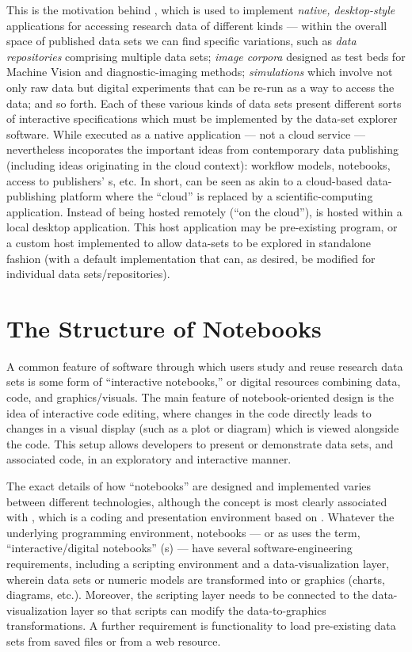 \documentclass[11pt,letterpaper]{article}
\newcommand{\ATextCClr}[1]{\textcolor{atcColor}{\textbf{#1}}}
\newcommand{\MdsX}{\resizebox{!}{7.5pt}{\ATextCClr{MdsX}}}
\newcommand{\lsMdsX}{\resizebox{!}{9pt}{\ATextCClr{MdsX}}}
\newcommand{\API}{\resizebox{!}{7pt}{\AcronymText{API}}}
\newcommand{\ThreeD}{\resizebox{!}{7pt}{\AcronymText{3D}}}
\newcommand{\TwoD}{\resizebox{!}{7pt}{\AcronymText{2D}}}
\newcommand{\textscc}[1]{{\color{orr!35!black}{{%
						\fontfamily{Cabin-TLF}\fontseries{b}\selectfont{\textsc{\scriptsize{#1}}}}}}}
\newcommand{\AcronymText}[1]{{\textscc{#1}}}
\newcommand{\p}[1]{

\vspace{1em}#1}
\newcommand{\q}[1]{{\fontfamily{qcr}\selectfont ``}#1{\fontfamily{qcr}\selectfont ''}}
\begin{document}
{\p{This is the motivation behind \Mdsx{}, which 
is used to implement \textit{native,} 
\textit{desktop-style} applications 
for accessing research data of different 
kinds --- within the overall space of 
published data sets we can find specific 
variations, such as \textit{data repositories} 
comprising multiple data sets; \textit{image corpora} 
designed as test beds for Machine Vision and 
diagnostic-imaging methods; \textit{simulations} 
which involve not only raw data but digital 
experiments that can be re-run as a way 
to access the data; and so forth.  Each of 
these various kinds of data sets present 
different sorts of interactive specifications 
which must be implemented by the data-set explorer 
software.  While executed as a native application 
--- not a cloud service --- \MdsX{} nevertheless incoporates 
the important ideas from contemporary data publishing 
(including ideas originating in the cloud context): 
workflow models, notebooks, access to publishers' 
\API{}s, etc.  In short, \MdsX{} can be seen as akin to 
a cloud-based data-publishing platform 
where the \q{cloud} is replaced by a 
scientific-computing application.  Instead of 
being hosted remotely (\q{on the cloud}), 
\MdsX{} is hosted within a local desktop application.  
This host application may be pre-existing 
program, or a custom host implemented 
to allow \MdsX{} data-sets to be explored in standalone 
fashion (with a default implementation that 
can, as desired, be modified for individual 
data sets/repositories).}


\section[The Structure of MdsX Notebooks]{The Structure of \protect\lsMdsX{} Notebooks}

\p{A common feature of software through which users 
study and reuse research data sets is some 
form of \q{interactive notebooks,} or 
digital resources combining data, code, 
and graphics/visuals.  The main feature of 
notebook-oriented design is the idea of 
interactive code editing, where changes in 
the code directly leads to changes in a visual 
display (such as a plot or diagram) which is 
viewed alongside the code.  This setup allows 
developers to present or demonstrate data 
sets, and associated code, in an exploratory 
and interactive manner.}

\p{The exact details of how \q{notebooks} are designed 
and implemented varies between different technologies, 
although the concept is most clearly associated 
with \Jupyter{}, which is a coding and presentation 
environment based on \Python{}.  Whatever the 
underlying programming environment, notebooks 
--- or as \MdsX{} uses the term, \q{interactive/digital 
notebooks} (\IDN{}s) --- have several software-engineering 
requirements, including a scripting environment and 
a data-visualization layer, wherein data sets 
or numeric models are transformed into \TwoD{} or 
\ThreeD{} graphics (charts, diagrams, etc.).  
Moreover, the scripting layer needs to be 
connected to the data-visualization layer so 
that scripts can modify the data-to-graphics 
transformations.  A further requirement is 
functionality to load pre-existing data sets from 
saved files or from a web resource.}

}
\end{document}
